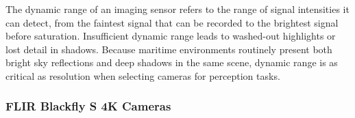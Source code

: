 \documentclass{erauthesis}
\begin{document}







The dynamic range of an imaging sensor refers to the range of signal intensities it can detect, from the faintest signal that can be recorded to the brightest signal before saturation.
Insufficient dynamic range leads to washed-out highlights or lost detail in shadows.  
Because maritime environments routinely present both bright sky reflections and deep shadows in the same scene, dynamic range is as critical as resolution when selecting cameras for perception tasks.  

\subsubsection{FLIR Blackfly S 4K Cameras} \label{sensors_FLIR}
\end{document}
